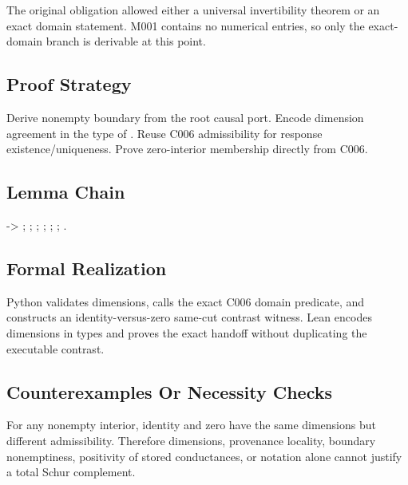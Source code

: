 The original obligation allowed either a universal invertibility theorem
or an exact domain statement. M001 contains no numerical entries, so
only the exact-domain branch is derivable at this point.

\subsection{Proof Strategy}\label{proof-strategy-6}

Derive nonempty boundary from the root causal port. Encode dimension
agreement in the type of \texttt{\protect{}}. Reuse C006
admissibility for response existence/uniqueness. Prove zero-interior
membership directly from C006.

\subsection{Lemma Chain}\label{lemma-chain-6}

\texttt{\protect{}} -\textgreater{}
\texttt{\protect{}}; \texttt{\protect{}};
\texttt{\protect{}}; \texttt{\protect{}};
\texttt{\protect{}};
\texttt{\protect{}};
\texttt{\protect{}}.

\subsection{Formal Realization}\label{formal-realization-6}

Python validates dimensions, calls the exact C006 domain predicate, and
constructs an identity-versus-zero same-cut contrast witness. Lean
encodes dimensions in types and proves the exact handoff without
duplicating the executable contrast.

\subsection{Counterexamples Or Necessity
Checks}\label{counterexamples-or-necessity-checks-6}

For any nonempty interior, identity \texttt{\protect{}} and zero
\texttt{\protect{}} have the same dimensions but different admissibility.
Therefore dimensions, provenance locality, boundary nonemptiness,
positivity of stored conductances, or notation alone cannot justify a
total Schur complement.

